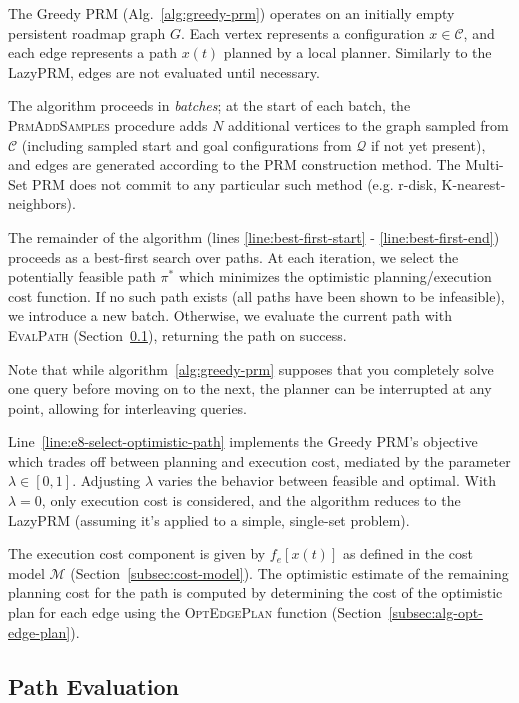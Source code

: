 The Greedy PRM (Alg.~\ref{alg:greedy-prm})
operates on an initially empty persistent roadmap graph $G$.
Each vertex represents a configuration $x \in \mathcal{C}$,
and each edge represents a path $x(t)$ planned by a local planner.
Similarly to the LazyPRM,
edges are not evaluated until necessary.

The algorithm proceeds in \emph{batches};
at the start of each batch,
the \textsc{PrmAddSamples} procedure adds
$N$ additional vertices to the graph sampled from $\mathcal{C}$
(including sampled start and goal configurations from $\mathcal{Q}$
if not yet present),
and edges are generated according to the PRM construction method.
The Multi-Set PRM does not commit to any particular such method
(e.g. r-disk, K-nearest-neighbors).

The remainder of the algorithm
(lines \ref{line:best-first-start} - \ref{line:best-first-end})
proceeds as a best-first search over paths.
At each iteration,
we select the potentially feasible path $\pi^*$
which minimizes the optimistic
planning/execution cost function.
If no such path exists
(all paths have been shown to be infeasible),
we introduce a new batch.
Otherwise, we evaluate the current path with
\textsc{EvalPath}
(Section~\ref{subsec:alg-path-evaluation}),
returning the path on success.

Note that while
algorithm~\ref{alg:greedy-prm} supposes that you completely solve
one query before moving on to the next,
the planner can be interrupted at any point,
allowing for interleaving queries.

Line~\ref{line:e8-select-optimistic-path}
implements the Greedy PRM's objective
which trades off between planning and execution cost,
mediated by the parameter $\lambda \in [0,1]$.
Adjusting $\lambda$ varies the behavior between feasible and optimal.
With $\lambda = 0$,
only execution cost is considered,
and the algorithm reduces to the LazyPRM
(assuming it's applied to a simple, single-set problem).

The execution cost component is given by $f_e[x(t)]$
as defined in the cost model $\mathcal{M}$
(Section~\ref{subsec:cost-model}).
The optimistic estimate of the remaining planning cost for the path
is computed by determining the cost of the optimistic plan for each
edge using the \textsc{OptEdgePlan} function
(Section~\ref{subsec:alg-opt-edge-plan}).

\subsection{Path Evaluation}
\label{subsec:alg-path-evaluation}

